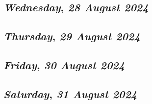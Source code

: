 \def\day{\textit{28 August 2024}}
\def\weekday{\textit{Wednesday}}
\subsection*{\weekday, \day}

\def\day{\textit{29 August 2024}}
\def\weekday{\textit{Thursday}}
\subsection*{\weekday, \day}

\def\day{\textit{30 August 2024}}
\def\weekday{\textit{Friday}}
\subsection*{\weekday, \day}

\def\day{\textit{31 August 2024}}
\def\weekday{\textit{Saturday}}
\subsection*{\weekday, \day}
